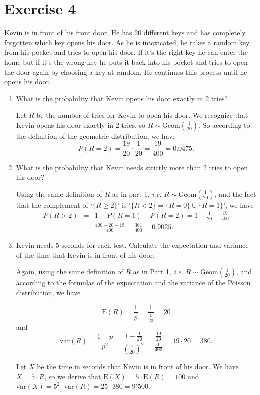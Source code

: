 \documentclass[12pt,thmsa]{article}
\begin{document}
\section*{Exercise 4}


Kevin is in front of his front door. He has 20 different keys and has completely forgotten which key opens his door. As he is intoxicated, he takes a random key from his pocket and tries to open his door. If it's the right key he can enter the home but if it's the wrong key he puts it back into his pocket and tries to open the door again by choosing a key at random. He continues this process until he opens his door.

\begin{enumerate}
\item What is the probability that Kevin opens his door exactly in 2 tries?

Let $R$ be the number of tries for Kevin to open his door. We recognize that Kevin opens his door exactly in 2 tries, so $ R \sim \text {Geom} (\frac{1}{20}) $. So according to the definition of the geometric distribution, we have
\begin{equation*}
P(R=2)= \frac{19}{20}\cdot\frac{1}{20} = \frac{19}{400} = 0.0475.
\end{equation*}
\item What is the probability that Kevin needs strictly more than 2 tries to open his door?

Using the same definition of $R$ as in part 1, {\it i.e.} $R \sim \text {Geom} (\frac{1}{20})$, and the fact that the complement of  `$\{R\geq 2\}$' is `$\{R<2\}=\{R=0\}\cup\{R=1\}$', we have
\begin{eqnarray*}
P(R> 2)&=& 1 - P(R=1)- P(R=2) = 1 - \frac{1}{20}-\frac{19}{400} \\
&=&  \frac{400-20-19}{400} = \frac{361}{400} = 0.9025.
\end{eqnarray*}
\item Kevin needs 5 seconds for each test. Calculate the expectation and variance of the time that Kevin is in front of his door.

Again, using the same definition of $ R $ as in Part 1, {\it i.e.}  $R \sim \text {Geom} (\frac{1}{20})$, and according to the formulas of the expectation and the variance of the Poisson distribution, we have

$$
\text{E}(R) = \frac{1}{p}=\frac{1}{\frac{1}{20}} = 20
$$
and
$$
\text{var}(R) =   \frac{1-p}{p^2}= \frac{1-\frac{1}{20}}{(\frac{1}{20})^2} =
\frac{\frac{19}{20}}{\frac{1}{400}} = 19\cdot 20 = 380.
$$

Let $ X $ be the time in seconds that Kevin is in front of his door. We have $X=5
\cdot R$, so we derive that $\text{E}(X)=5\cdot \text{E}(R) = 100 $ 
and $\text{var}(X)=5^2 \cdot \text{var}(R) = 25 \cdot 380 = 9'500$.
\end{enumerate}
\end{document}
